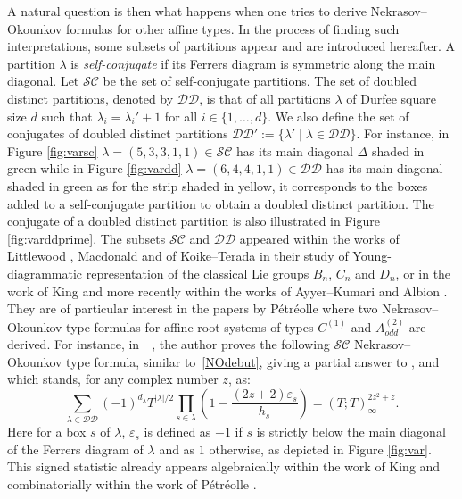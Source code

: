 \documentclass[11pt,letterpaper]{amsart}
\def\ccsc{\mathcal {SC}}
\def\ccdd{\mathcal {DD}}
\numberwithin{equation}{section}
\numberwithin{df}{section}
\begin{document}
A natural question is then what happens when one tries to derive Nekrasov--Okounkov formulas for other affine types. In the process of finding such interpretations, some subsets of partitions appear and are introduced hereafter. A partition $\lambda$ is \textit{self-conjugate} if its Ferrers diagram is symmetric along the main diagonal. Let $\mathcal{SC}$ be the set of self-conjugate partitions. The set of doubled distinct partitions, denoted by $\ccdd$, is that of all partitions $\lambda$ of Durfee square size $d$ such that $\lambda_i=\lambda_i'+1$ for all $i\in\lbrace 1,\dots,d\rbrace$. We also define the set of conjugates of doubled distinct partitions $\ccdd':=\lbrace \lambda'\mid \lambda\in\ccdd\rbrace$. For instance, in Figure \ref{fig:varsc} $\lambda=(5,3,3,1,1)\in\ccsc$ has its main diagonal $\Delta$ shaded in green while in Figure \ref{fig:vardd} $\lambda=(6,4,4,1,1)\in\ccdd$ has its main diagonal shaded in green as for the strip shaded in yellow, it corresponds to the boxes added to a self-conjugate partition to obtain a doubled distinct partition. The conjugate of a doubled distinct partition is also illustrated in Figure \ref{fig:varddprime}. The subsets $\ccsc$ and $\ccdd$ appeared within the works of Littlewood \cite{Little}, Macdonald \cite[p.78--79]{Macbook} and of  Koike--Terada \cite{KoikeTerada} in their study of Young-diagrammatic representation of the classical Lie groups $B_n$, $C_n$ and $D_n$, or in the work of King \cite{King} and more recently within the works of Ayyer--Kumari \cite{AyyerKumari} and Albion \cite{Albion}. They are of particular interest in the papers by P\'etr\'eolle \cite{Pe,MP} where two Nekrasov--Okounkov type formulas for affine root systems of types $C^{(1)}$ and $A^{(2)}_{odd}$ are derived. For instance, in~~\cite{Pe,MP}, the author proves the following $\ccsc$ Nekrasov--Okounkov type formula, similar to~\eqref{NOdebut}, giving a partial answer to \cite[Problem $6.4$]{Hancon}, and which stands, for any complex number $z$, as: 
\begin{equation}\label{eq:nospecc}
\sum_{\lambda\in\ccdd}(-1)^{d_\lambda}T^{\lvert \lambda\rvert/2}\prod_{s\in\lambda}\left(1-\frac{(2z+2)\varepsilon_s}{h_s}\right)=\left(T;T\right)_{\infty}^{2z^2+z}.
\end{equation}
Here for a box $s$ of $\lambda$, \textit{$\varepsilon_s$} is defined as $-1$ if $s$ is strictly below the main diagonal of the Ferrers diagram of $\lambda$ and as $1$ otherwise, as depicted in Figure \ref{fig:var}. This signed statistic already appears algebraically within the work of King \cite{King} and combinatorially within the work of Pétréolle \cite{MP}.
\end{document}
